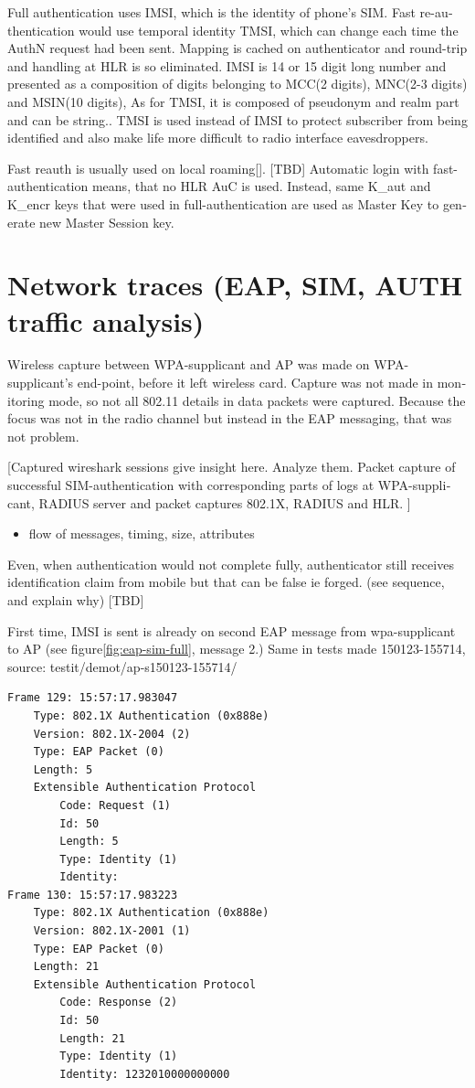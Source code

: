 \documentclass[12pt,a4paper,english]{tutthesis}
\begin{document}
\begin{otherlanguage}{english}
Full authentication uses IMSI, which is the identity of phone's SIM.
Fast re-authentication would use temporal identity TMSI, which 
can change each time the AuthN request had been sent. Mapping
is cached on authenticator and round-trip and handling at HLR is
so eliminated. 
IMSI is 14 or 15 digit long number and presented as a composition
of digits belonging to MCC(2 digits), MNC(2-3 digits) and MSIN(10 digits),
As for TMSI, it is composed of pseudonym and realm part and can be string..
TMSI is used instead of IMSI to protect subscriber from being
identified and also make life more difficult to radio interface
eavesdroppers\cite{imsi-tmsi}.

Fast reauth is usually used on
local roaming[\cite{xxx}]. [TBD]
Automatic login with fast-authentication means, that no HLR AuC
is used. Instead, same K\_aut and K\_encr keys  that were used in full-authentication are used  as Master Key to generate new Master Session key.\cite[p.30]{rfc4186}


\section{Network traces (EAP, SIM, AUTH traffic analysis)}
\label{sec-5-4}
Wireless capture between WPA-supplicant and AP was made on
WPA-supplicant's end-point, before it left wireless card. Capture was
not made in monitoring mode, so not all 802.11 details in
data packets were captured\cite{wireshark-capture}.  Because the focus was not in the
radio channel but instead in the EAP messaging, that was not problem.


[Captured wireshark sessions give insight here. Analyze them.
Packet capture of successful SIM-authentication with corresponding
parts of logs at WPA-supplicant, RADIUS server and packet captures 
802.1X, RADIUS and HLR. ]

\begin{itemize}
\item flow of messages,  timing,  size, attributes
\end{itemize}

Even, when authentication would not complete fully, authenticator
still receives identification claim from mobile but that can be false
ie forged.  
(see sequence, and explain why) [TBD]

First time, IMSI is sent is already on second EAP message from 
wpa-supplicant to AP (see figure\ref{fig:eap-sim-full}, message 2.)
Same in tests made 150123-155714, source: testit/demot/ap-s150123-155714/
\begin{verbatim}
Frame 129: 15:57:17.983047
    Type: 802.1X Authentication (0x888e)
    Version: 802.1X-2004 (2)
    Type: EAP Packet (0)
    Length: 5
    Extensible Authentication Protocol
        Code: Request (1)
        Id: 50
        Length: 5
        Type: Identity (1)
        Identity: 
Frame 130: 15:57:17.983223
    Type: 802.1X Authentication (0x888e)
    Version: 802.1X-2001 (1)
    Type: EAP Packet (0)
    Length: 21
    Extensible Authentication Protocol
        Code: Response (2)
        Id: 50
        Length: 21
        Type: Identity (1)
        Identity: 1232010000000000
\end{verbatim}


\end{otherlanguage}
\end{document}
